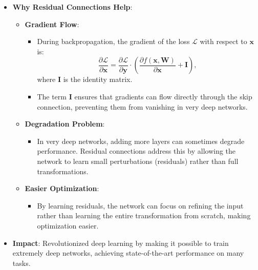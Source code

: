 \begin{notechapter}
\begin{itemize}
  \item \textbf{Why Residual Connections Help}:
    \begin{itemize}
      \item \textbf{Gradient Flow}:
        \begin{itemize}
          \item During backpropagation, the gradient of the loss \( 
            \mathcal{L} \) with respect to \( \mathbf{x} \) is:
            \[
            \frac{\partial \mathcal{L}}{\partial \mathbf{x}} = 
            \frac{\partial \mathcal{L}}{\partial \mathbf{y}} \cdot 
            \left( \frac{\partial f(\mathbf{x}, \mathbf{W})}{
            \partial \mathbf{x}} + \mathbf{I} \right),
            \]
            where \( \mathbf{I} \) is the identity matrix.
          \item The term \( \mathbf{I} \) ensures that gradients can 
            flow directly through the skip connection, preventing them 
            from vanishing in very deep networks.
        \end{itemize}
      \item \textbf{Degradation Problem}:
        \begin{itemize}
          \item In very deep networks, adding more layers can sometimes 
            degrade performance. Residual connections address this by 
            allowing the network to learn small perturbations 
            (residuals) rather than full transformations.
        \end{itemize}
      \item \textbf{Easier Optimization}:
        \begin{itemize}
          \item By learning residuals, the network can focus on 
            refining the input rather than learning the entire 
            transformation from scratch, making optimization easier.
        \end{itemize}
    \end{itemize}
  \item \textbf{Impact}: Revolutionized deep learning by making it 
    possible to train extremely deep networks, achieving 
    state-of-the-art performance on many tasks.
\end{itemize}


\end{notechapter}
